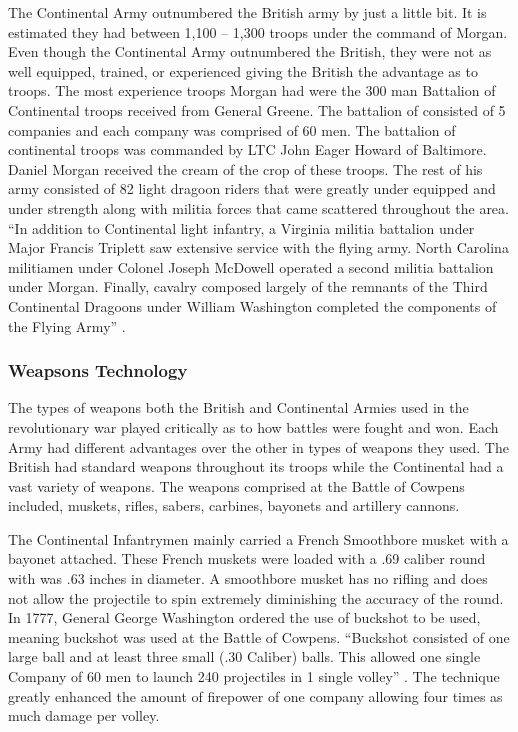 The   Continental Army outnumbered the British army by just a little bit.  It is
estimated they had between 1,100 – 1,300 troops under the command of Morgan.
Even though the Continental Army outnumbered the British, they were not as well
equipped, trained, or experienced giving the British the advantage as to troops.
The most experience troops Morgan had were the 300 man Battalion of Continental
troops received from General Greene.  The battalion of consisted of 5 companies
and each company was comprised of 60 men.  The battalion of continental troops
was commanded by LTC John Eager Howard of Baltimore.  Daniel Morgan received the
cream of the crop of these troops.  The rest of his army consisted of 82 light
dragoon riders that were greatly under equipped and under strength along with
militia forces that came scattered throughout the area.  “In addition to
Continental light infantry, a Virginia militia battalion under Major Francis
Triplett saw extensive service with the flying army.  North Carolina militiamen
under Colonel Joseph McDowell operated a second militia battalion under Morgan.
Finally, cavalry composed largely of the remnants of the Third Continental
Dragoons under William Washington completed the components of the Flying Army”
\cite[p.25]{babits_devil_2001}.

\subsubsection{Weapsons Technology}


The types of weapons both the British and Continental Armies used in the
revolutionary war played critically as to how battles were fought and won.  Each
Army had different advantages over the other in types of weapons they used.  The
British had standard weapons throughout its troops while the Continental had a
vast variety of weapons. The weapons comprised at the Battle of Cowpens
included, muskets, rifles, sabers, carbines, bayonets and artillery cannons.  

The Continental Infantrymen mainly carried a French Smoothbore musket with a
bayonet attached.  These French muskets were loaded with a .69 caliber round
with was .63 inches in diameter.  A smoothbore musket has no rifling and does
not allow the projectile to spin extremely diminishing the accuracy of the
round.  In 1777, General George Washington ordered the use of buckshot to be
used, meaning buckshot was used at the Battle of Cowpens.  “Buckshot consisted
of one large ball and at least three small (.30 Caliber) balls.  This allowed
one single Company of 60 men to launch 240 projectiles in 1 single volley”
\cite[p.12]{babits_devil_2001}.  The technique greatly enhanced the amount of firepower of one
company allowing four times as much damage per volley.

